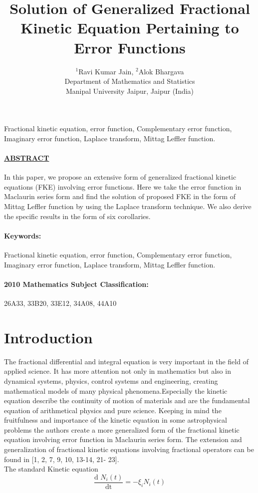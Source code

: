 \documentclass{article}
\title{Solution of Generalized Fractional Kinetic Equation Pertaining to Error Functions}
\author{${^1}$Ravi Kumar Jain, ${^2}$Alok Bhargava\\Department of Mathematics and Statistics\\Manipal University Jaipur, Jaipur (India)}
\date{}
\begin{document}
\maketitle
{}
\newcommand{\frsum}[1][Work]{
    \frac{2}{\sqrt{\pi}}
    $\sum$}Fractional kinetic equation, error function, Complementary error function, Imaginary error function, Laplace transform, Mittag Leffler function.
\paragraph{\textbf{\underline{ABSTRACT}}}
In this paper, we propose an extensive form of generalized fractional kinetic equations (FKE) involving error functions. Here we take the error function in Maclaurin series form and find the solution of proposed FKE in the form of Mittag Leffler function by using the Laplace transform technique. We also derive the specific results in the form of six corollaries.

\paragraph{Keywords:}
Fractional kinetic equation, error function, Complementary error function, Imaginary error function, Laplace transform, Mittag Leffler function.

\paragraph{2010 Mathematics Subject Classification:} 26A33, 33B20, 33E12, 34A08, 44A10

\section{Introduction}
The fractional differential and integral equation is very important in the field of applied science. It has more attention not only in mathematics but also in dynamical systems, physics, control systems and engineering, creating mathematical models of many physical phenomena.Especially the kinetic equation describe the continuity of motion of materials and are the fundamental equation of arithmetical physics and pure science. Keeping in mind the fruitfulness and importance of the kinetic equation in some astrophysical problems the authors create a more generalized form of the fractional kinetic equation involving error function in Maclaurin series form. The extension and generalization of fractional kinetic equations involving fractional operators can be found in [1, 2, 7, 9, 10, 13-14, 21- 23].\\
The standard Kinetic equation
\begin{equation}
    \frac{\text{d $N_i(t)$}}{\text{dt}}
    = -\xi _i N_i(t)
\end{equation}
\end{document}
